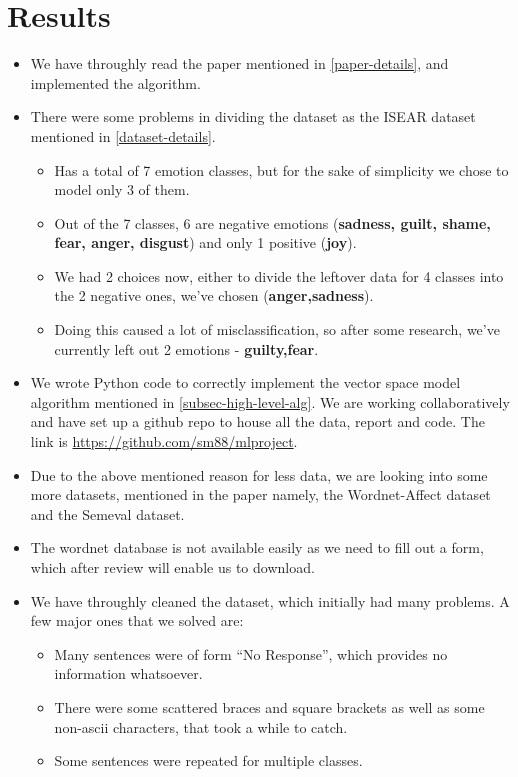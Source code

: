 \section{Results}
\begin{itemize}
 \item We have throughly read the paper mentioned in \ref{paper-details}, and implemented the algorithm.
 \item There were some problems in dividing the dataset as the ISEAR dataset mentioned in \ref{dataset-details}.
 \begin{itemize}
  \item Has a total of 7 emotion classes, but for the sake of simplicity we chose to model only 3 of them.
  \item Out of the 7 classes, 6 are negative emotions (\textbf{sadness, guilt, shame, fear, anger, disgust}) and only 1 positive (\textbf{joy}).
  \item We had 2 choices now, either to divide the leftover data for 4 classes into the 2 negative ones, we've chosen (\textbf{anger,sadness}).
  \item Doing this caused a lot of misclassification, so after some research, we've currently left out 2 emotions - \textbf{guilty,fear}.
 \end{itemize}
 \item We wrote Python code to correctly implement the vector space model algorithm mentioned in \ref{subsec-high-level-alg}. We are working collaboratively and have set up a github repo to house all the data, report and code. The link is \url{https://github.com/sm88/mlproject}.
 \item Due to the above mentioned reason for less data, we are looking into some more datasets, mentioned in the paper namely, the Wordnet-Affect dataset and the Semeval dataset.
 \item The wordnet database is not available easily as we need to fill out a form, which after review will enable us to download.
 \item We have throughly cleaned the dataset, which initially had many problems. A few major ones that we solved are:
 \begin{itemize}
  \item Many sentences were of form ``No Response'', which provides no information whatsoever.
  \item There were some scattered braces and square brackets as well as some non-ascii characters, that took a while to catch.
  \item Some sentences were repeated for multiple classes.
 \end{itemize}
 \end{itemize}
 \newpage
